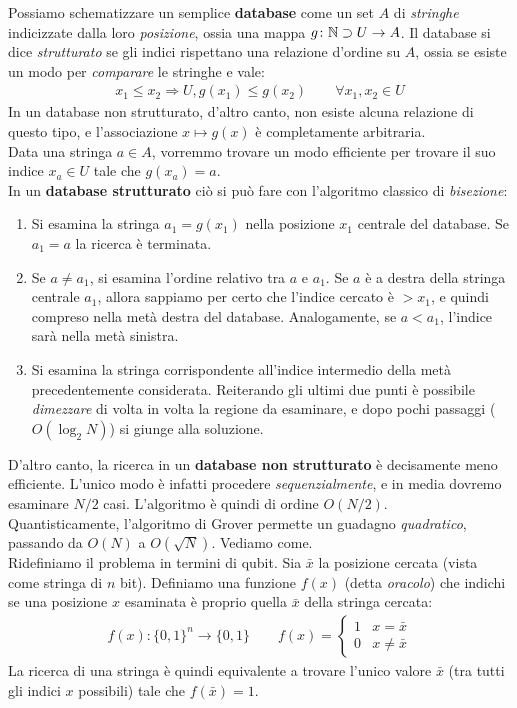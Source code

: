 \documentclass[../../InformazioneQuantistica.tex]{subfiles}
\begin{document}
Possiamo schematizzare un semplice \textbf{database} come un set $A$ di \textit{stringhe} indicizzate dalla loro \textit{posizione}, ossia una mappa $g\colon \mathbb{N} \supset U \to A$. Il database si dice \textit{strutturato} se gli indici rispettano una relazione d'ordine su $A$, ossia se esiste un modo per \textit{comparare} le stringhe e vale:
\begin{align*}
    x_1 \leq x_2 \Rightarrow U, g(x_1) \leq g(x_2) \qquad \forall x_1, x_2 \in U
\end{align*}
In un database non strutturato, d'altro canto, non esiste alcuna relazione di questo tipo, e l'associazione $x\mapsto g(x)$ è completamente arbitraria.\\
Data una stringa $a \in A$, vorremmo trovare un modo efficiente per trovare il suo indice $x_a \in U$ tale che $g(x_a) = a$.\\
In un \textbf{database strutturato} ciò si può fare con l'algoritmo classico di \textit{bisezione}:
\begin{enumerate}
    \item Si esamina la stringa $a_1 = g(x_1)$ nella posizione $x_1$ centrale del database. Se $a_1 = a$ la ricerca è terminata.
    \item Se $a \neq a_1$, si esamina l'ordine relativo tra $a$ e $a_1$. Se $a$ è a destra della stringa centrale $a_1$, allora sappiamo per certo che l'indice cercato è $>x_1$, e quindi compreso nella metà destra del database. Analogamente, se $a < a_1$, l'indice sarà nella metà sinistra.
    \item Si esamina la stringa corrispondente all'indice intermedio della metà precedentemente considerata. Reiterando gli ultimi due punti è possibile \textit{dimezzare} di volta in volta la regione da esaminare, e dopo pochi passaggi ($O(\log_2 N)$) si giunge alla soluzione.
\end{enumerate}
D'altro canto, la ricerca in un \textbf{database non strutturato} è decisamente meno efficiente. L'unico modo è infatti procedere \textit{sequenzialmente}, e in media dovremo esaminare $N/2$ casi. L'algoritmo è quindi di ordine $O(N/2)$.\\

Quantisticamente, l'algoritmo di Grover permette un guadagno \textit{quadratico}, passando da $O(N)$ a $O(\sqrt{N})$. Vediamo come.\\

Ridefiniamo il problema in termini di qubit. Sia $\bar{x}$ la posizione cercata (vista come stringa di $n$ bit). Definiamo una funzione $f(x)$ (detta \textit{oracolo}) che indichi se una posizione $x$ esaminata è proprio quella $\bar{x}$ della stringa cercata:
\begin{align*}
f(x):\{0,1\}^n \to \{0,1\} \qquad f(x) = \begin{cases}
1 & x = \bar{x}\\
0 & x \neq \bar{x}
\end{cases}
\end{align*}
La ricerca di una stringa è quindi equivalente a trovare l'unico valore $\bar{x}$ (tra tutti gli indici $x$ possibili) tale che $f(\bar{x}) = 1$.\\
\end{document}
